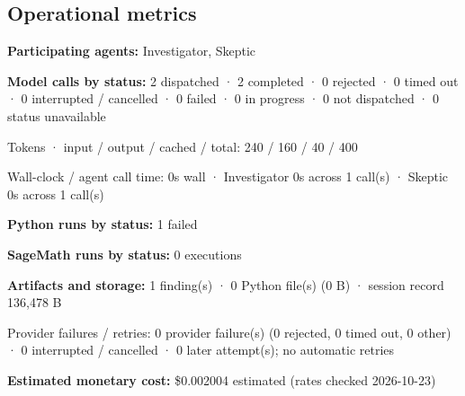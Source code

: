\documentclass[11pt]{article}
\begin{document}
\subsection{Operational metrics}
\textbf{Participating agents:} Investigator, Skeptic\par
\textbf{Model calls by status:} 2 dispatched · 2 completed · 0 rejected · 0 timed out · 0 interrupted / cancelled · 0 failed · 0 in progress · 0 not dispatched · 0 status unavailable\par
Tokens · input / output / cached / total: 240 / 160 / 40 / 400\par
Wall-clock / agent call time: 0s wall · Investigator 0s across 1 call(s) · Skeptic 0s across 1 call(s)\par
\textbf{Python runs by status:} 1 failed\par
\textbf{SageMath runs by status:} 0 executions\par
\textbf{Artifacts and storage:} 1 finding(s) · 0 Python file(s) (0 B) · session record 136,478 B\par
Provider failures / retries: 0 provider failure(s) (0 rejected, 0 timed out, 0 other) · 0 interrupted / cancelled · 0 later attempt(s); no automatic retries\par
\textbf{Estimated monetary cost:} \$0.002004 estimated (rates checked 2026-10-23)\par
\end{document}
